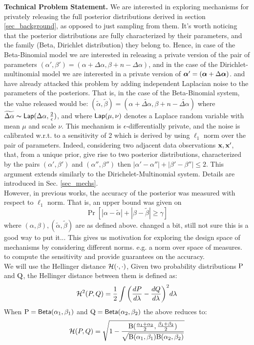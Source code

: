 \documentclass{article}
\begin{document}
\noindent \textbf{Technical Problem Statement.}
\label{subsec_problem}
We are interested in exploring mechanisms for privately releasing the full posterior
distributions derived in section \ref{sec_background}, as opposed to just sampling from them.
It's worth noticing that the posterior distributions are fully characterized
by their parameters, and the family (Beta, Dirichlet distribution) they belong to. Hence, in case of the
Beta-Binomial model we are interested in releasing a private version of the pair of
parameters $(\alpha',\beta')=(\alpha + \Delta \alpha,\beta + n - \Delta \alpha)$, and
in the case of the Dirichlet-multinomial model we are interested in a private version of
$\boldsymbol{\alpha}'=(\boldsymbol{\alpha} + \Delta \boldsymbol{\alpha})$. \cite{zhang2016differential} and \cite{xiao2012bayesian}
have already attacked this problem by adding independent Laplacian noise to the
parameters of the posteriors. That is, in the case of the Beta-Binomial system,
the value released would be: $(\tilde\alpha,\tilde\beta)=(\alpha +  \widetilde{\Delta \alpha},\beta + n - \widetilde{\Delta \alpha})$
where $\widetilde{\Delta \alpha}\thicksim \mathsf{Lap}(\Delta \alpha, \frac{2}{\epsilon})$,
and where $\mathsf{Lap}(\mu, \nu)$ denotes a Laplace random variable with mean $\mu$ and scale $\nu$.
This mechanism is $\epsilon$-differentially private, and the noise is
calibrated w.r.t. to a sensitivity of 2 which is derived by using
$\ell_1$ norm over the pair of parameters. Indeed, considering two
adjacent data observations $\textbf{x}, \textbf{x}'$, that, from a unique prior, give rise to two posterior
distributions, characterized by the pairs
$(\alpha',\beta')$ and $(\alpha'',\beta'')$ then
$|\alpha'-\alpha''|+|\beta'-\beta''|\leq 2$.
This argument extends similarly to the Dirichelet-Multinomial system. Details are introduced in Sec. \ref{sec_mechs}.\\
However, in previous works, the accuracy of the posterior was measured with respect to $\ell_1$ norm. That is, an upper bound was given on
\[
  \Pr[|\alpha - \tilde\alpha| + |\beta - \tilde\beta |\geq \gamma ]
\]
where $(\alpha, \beta), (\tilde\alpha,\tilde\beta)$ are as defined above.
{\color{blue} changed a bit, still not sure this is a good way to put it...}
This gives us motivation for exploring the design space
of mechanisms by considering different norms. e.g. a norm over space of measures.
to compute the sensitivity and provide guarantees on the accuracy.\\
We will use the Hellinger distance $\mathcal{H}(\cdot,\cdot)$, 
Given two probability distributions $\textup{P}$ and $\textup{Q}$,
the Hellinger distance between them is defined as:
\[
\mathcal{H}^2(P,Q) = \frac{1}{2} \int \bigg(\frac{dP}{d \lambda} - \frac{dQ}{d \lambda}\bigg)^2 d \lambda
\]
When $\textup{P}=\mathsf{Beta}(\alpha_1, \beta_1)$ and $\textup{Q}=\mathsf{Beta}(\alpha_2, \beta_2)$ the above reduces to: 
\[
 \mathcal{H}(P,Q) =  \sqrt{1 - \frac{\textup{B}(\frac{\alpha_1 + \alpha_2}{2}, \frac{\beta_1 + \beta_2}{2})}{\sqrt{\textup{B}(\alpha_1,\beta_1)\textup{B}(\alpha_2,\beta_2)}}}
\]
\end{document}
